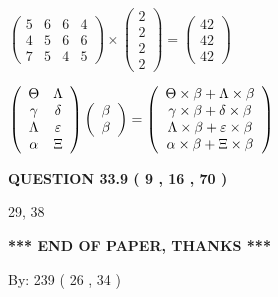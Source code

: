 \documentclass[12pt]{article}
\begin{document}
 
$\left( \begin{array}{ccccccccccccccc}
           5  & 
           6  & 
           6  & 
           4  \\ 
           4  & 
           5  & 
           6  & 
           6  \\ 
           7  & 
           5  & 
           4  & 
           5
\end{array}\right) \times
\left( \begin{array}{c}
           2  \\ 
           2  \\ 
           2  \\ 
           2
\end{array}\right)  =
\left( \begin{array}{c}
          42  \\ 
          42  \\ 
          42
\end{array}\right)  $
 
$  %
 \left( \begin{array}
 {
 c
 c
 }
 \Theta & 
 \Lambda \\ 
 \gamma & 
 \delta \\ 
 \Lambda & 
 \varepsilon \\ 
 \alpha & 
                    \Xi
 \end{array} \right)
 \left( \begin{array}
 {
 c
 }
 \beta \\ 
 \beta
 \end{array} \right)
=
 \left( \begin{array}
 {
 c
 }
  \Theta \times  \beta +  \Lambda \times  \beta \\ 
  \gamma \times  \beta +  \delta \times  \beta \\ 
  \Lambda \times  \beta +  \varepsilon \times  \beta \\ 
  \alpha \times  \beta +                     \Xi \times  \beta
 \end{array} \right)
$
 
  
  
{\textbf{\large{QUESTION
33.9 
 (           9 ,          16 ,          70 )
}}}

29,  %
38
 
   
   
   
   
\vspace{1.0in} 
{\textbf{\large{ *** END OF PAPER, THANKS *** }}} 
   
   
\hspace{1.0in} By: 
         239 (          26 ,           34 )
   
\end{document}
